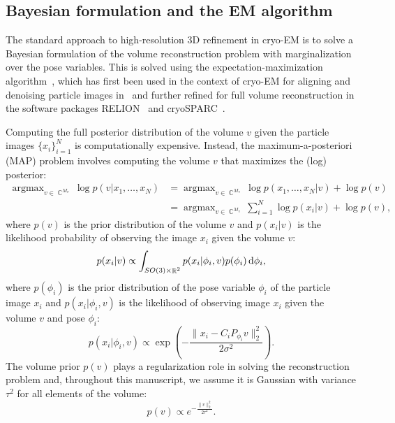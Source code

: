 \documentclass{article}
\DeclareMathOperator{\Rb}{\mathbb{R}}
\DeclareMathOperator{\Cb}{\mathbb{C}}
\DeclareMathOperator*{\argmax}{argmax}
\begin{document}
\subsection{Bayesian formulation and the EM algorithm}

The standard approach to high-resolution 3D refinement in cryo-EM is to solve a Bayesian 
formulation of the volume reconstruction problem with marginalization over the 
pose variables. This is solved using the expectation-maximization 
algorithm~\cite{dempster_maximum_1977}, which has first been used in 
the context of cryo-EM for aligning and denoising particle images 
in~\cite{sigworth_maximum-likelihood_1998} and further refined 
for full volume reconstruction in the software packages RELION~\cite{scheres_relion_2012}
and cryoSPARC~\cite{punjani_cryosparc_2017}.

Computing the full posterior distribution of the volume $v$ given the particle 
images $\{x_i\}_{i=1}^N$ is computationally expensive. 
Instead, the maximum-a-posteriori (MAP) problem involves computing the volume $v$ 
that maximizes the (log) posterior:
\begin{align}
    \argmax_{v\in\Cb^{M_v}} \log p(v | x_1,\ldots,x_N) 
    &= \argmax_{v\in\Cb^{M_v}} \log p(x_1,\ldots,x_N | v) + \log p(v) \nonumber \\
    &= \argmax_{v\in\Cb^{M_v}} \sum_{i=1}^N \log p(x_i|v) + \log p(v),
    \label{eq:posterior}
\end{align}
where $p(v)$ is the prior distribution of the volume $v$ and $p(x_i | v)$ is the
likelihood probability of observing the image $x_i$ given the volume $v$:
\begin{equation}
    p(x_i | v) \propto 
    \int_{SO(3)\times\Rb^2} p(x_i | \phi_i, v) p(\phi_i) \dif \phi_i, 
    \label{eq:likelihood}
\end{equation}
where $p(\phi_i)$ is the prior distribution of the pose variable $\phi_i$ of the 
particle image $x_i$ and $p(x_i|\phi_i,v)$ is the likelihood of observing 
image $x_i$ given the volume $v$ and pose $\phi_i$:
\begin{equation*}
    p(x_i|\phi_i,v) \propto \exp\left(
        -\frac{\|x_i - C_i P_{\phi_i}v\|_2^2}{2\sigma^2}
    \right).
\end{equation*}
The volume prior $p(v)$ plays a regularization role 
in solving the reconstruction problem and, throughout this manuscript, we assume 
it is Gaussian with variance $\tau^2$ for all elements of the volume:
\begin{equation*}
    p(v) \propto e^{-\frac{\|v\|_2^2}{2\tau^2}}.
\end{equation*}
\end{document}
